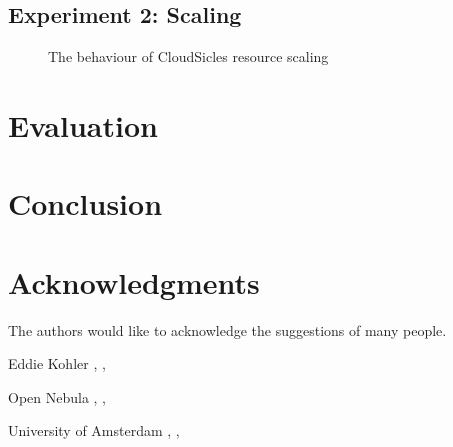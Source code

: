 \documentclass[twocolumn,twoside]{IEEEtran}
\begin{document}
\subsection{Experiment 2: Scaling}

\begin{figure}[b]
\begin{center}
\begin{adjustwidth}{}{}
   \end{adjustwidth}
\caption{The behaviour of CloudSicles resource scaling}
\end{center}
\end{figure}

\section{Evaluation}
\label{sec:eval}

\section{Conclusion}
\label{sec:concl}

\section*{Acknowledgments}
The authors would like to acknowledge the suggestions of many people.


\nocite{*}


%
\begin{thebibliography}{1}
Eddie Kohler
,
,

Open Nebula
,
,

University of Amsterdam
,
,
\end{thebibliography}
%
\end{document}
